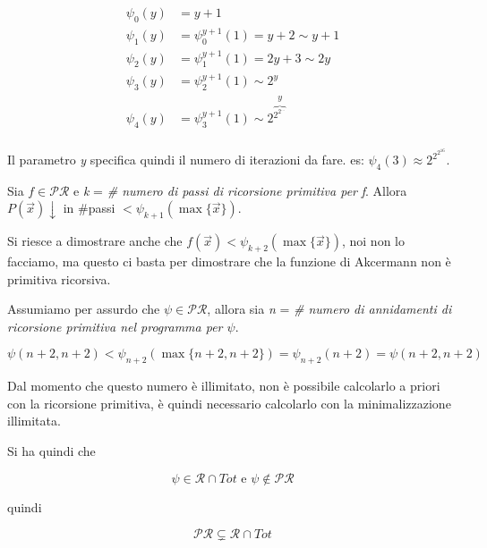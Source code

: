 \begin{align*}
\psi_{0}(y) &= y+1 \\
\psi_{1}(y) &= \psi_{0}^{y+1}(1) = y+2 \sim y+1\\
\psi_{2}(y) &= \psi_{1}^{y+1}(1) = 2y+3 \sim 2y\\
\psi_{3}(y) &= \psi_{2}^{y+1}(1) \sim 2^y\\
\psi_{4}(y) &= \psi_{3}^{y+1}(1) \sim 2\overbrace{^{2^{2^{\ldots}}}}^{y}\\
\end{align*}

Il parametro \textit{y} specifica quindi il numero di iterazioni da fare. es: $ \psi_4(3)\approx 2^{2^{2^{16}}}$.

Sia $ f \in \mathcal{PR} $ e \textit{k} = \textit{\# numero di passi di ricorsione primitiva per} \textit{f}.
Allora $ P(\vec{x})\downarrow $ in \#passi $ < \psi_{k+1}(\max\{\vec{x}\})$.

Si riesce a dimostrare anche che $f(\vec{x}) < \psi_{k+2}(\max\{\vec{x}\})$, noi non lo facciamo, ma questo ci basta per dimostrare che la funzione di Akcermann non è primitiva ricorsiva.

Assumiamo per assurdo che $\psi \in \mathcal{PR}$, allora sia \textit{n} = \textit{\# numero di annidamenti di ricorsione primitiva nel programma per $ \psi $}.

$$
\psi(n+2, n+2) < \psi_{n+2}(\max\{n+2, n+2\}) = \psi_{n+2}(n+2) = \psi(n+2, n+2)
$$

Dal momento che questo numero è illimitato, non è possibile calcolarlo a priori con la ricorsione primitiva, è quindi necessario calcolarlo con la minimalizzazione illimitata.

Si ha quindi che

$$
\psi \in \mathcal{R} \cap Tot \text{ e } \psi \notin \mathcal{PR}
$$

quindi

$$
\mathcal{PR} \subsetneq \mathcal{R} \cap Tot
$$




























